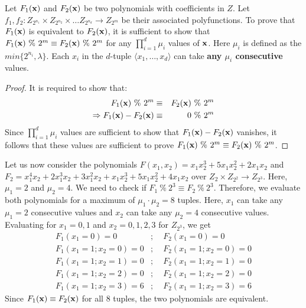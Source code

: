 \begin{Corollary}\label{cor:proof1}
Let $F_1({\bf x})$ and $F_2({\bf x})$ be two polynomials with
coefficients in $Z$. Let $f_1, f_2:Z_{2^{n_1}} \times Z_{2^{n_2}}
\times \ldots Z_{2^{n_d}} \to Z_{2^m}$ be their associated
polyfunctions. To prove that $F_1({\bf x})$ is equivalent to $F_2({\bf
x})$, it is sufficient to show that $F_1({\bf x}) ~\% ~2^m \equiv
F_2({\bf x}) ~\% ~2^m$ for any $\prod_{i=1}^d \mu_i$ values of ${\bf
x}$. Here $\mu_i$ is defined as the $min \{2^{n_i}, \lambda\}$. Each
$x_i$ in the $d$-tuple $\langle x_1, \ldots, x_d \rangle$ can take
{\bf any $\mu_i$ consecutive} values.
\end{Corollary}

\begin{proof}
It is required to show that:
\begin{eqnarray}
            F_1({\bf x}) ~\% ~2^m &\equiv& F_2({\bf x}) ~\% ~2^m \nonumber \\
\Rightarrow F_1({\bf x}) - F_2({\bf x}) &\equiv& 0 ~\% ~2^m
\end{eqnarray}
Since $\prod_{i=1}^d \mu_i$ values are sufficient to show that $F_1({\bf x})
- F_2({\bf x})$ vanishes, it follows that these values are sufficient
to prove $F_1({\bf x}) ~\% ~2^m\equiv F_2({\bf x}) ~\% ~2^m$.
\end{proof}

\begin{Example}\label{ex:cor_proof1}
Let us now consider the polynomials $F(x_1,x_2) = x_1x_2^3 + 5x_1x_2^2
+ 2x_1x_2$ and $F_2 = x_1^4 x_2 + 2x_1^3 x_2 + 3x_1^2 x_2 + x_1 x_2^3
+ 5x_1 x_2^2 + 4x_1x_2 $ over $Z_{2} \times Z_{2^2} \rightarrow
Z_{2^3}$. Here, $\mu_1 = 2$ and $\mu_2 = 4$. We need to check if $F_1
~\% ~2^3 \equiv F_2 ~\% ~2^3$. Therefore, we evaluate both polynomials
for a maximum of $\mu_1 \cdot \mu_2 = 8$ tuples. Here, $x_1$ can take
any $\mu_1 = 2$ consecutive values and $x_2$ can take any $\mu_2 = 4$
consecutive values. Evaluating for $x_1 = 0, 1$ and $x_2 = 0, 1, 2, 3$
for $Z_{2^3}$, we get
\begin{eqnarray}
F_1(x_1 = 0) = 0 &;& ~~F_2(x_1 = 0) = 0 \nonumber \\
F_1(x_1 = 1; x_2 = 0) = 0 &;& ~~F_2(x_1 = 1; x_2 = 0) = 0 \nonumber \\
F_1(x_1 = 1; x_2 = 1) = 0 &;& ~~F_2(x_1 = 1; x_2 = 1) = 0 \nonumber\\
F_1(x_1 = 1; x_2 = 2) = 0 &;& ~~F_2(x_1 = 1; x_2 = 2) = 0 \nonumber \\
F_1(x_1 = 1; x_2 = 3) = 6 &;& ~~F_2(x_1 = 1; x_2 = 3) = 6\nonumber 
\end{eqnarray}
Since $F_1 ({\bf x}) \equiv F_2({\bf x})$ for all $8$ tuples, the two
polynomials are equivalent.
\end{Example}